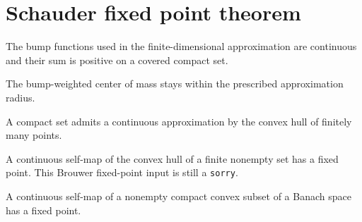 \section{Schauder fixed point theorem}

\begin{lemma}
\label{lem:schauder-bumps}
\leanok
The bump functions used in the finite-dimensional approximation are continuous and their sum is positive on a covered compact set.
\end{lemma}

\begin{lemma}
\label{lem:schauder-center}
\leanok
{}
The bump-weighted center of mass stays within the prescribed approximation radius.
\end{lemma}

\begin{theorem}
\label{thm:schauder-projection}
\leanok
{}
A compact set admits a continuous approximation by the convex hull of finitely many points.
\end{theorem}

\begin{theorem}
\label{thm:schauder-brouwer}
\notready
A continuous self-map of the convex hull of a finite nonempty set has a fixed point. This Brouwer fixed-point input is still a \texttt{sorry}.
\end{theorem}

\begin{theorem}
\label{thm:schauder-fixed-point}
\notready
{}
A continuous self-map of a nonempty compact convex subset of a Banach space has a fixed point.
\end{theorem}
